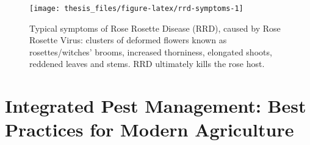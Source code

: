 \documentclass{ufdissertation}[overrideChapters] %
\begin{document}
{\begin{figure}
{\centering \texttt{[image: thesis\_files/figure-latex/rrd-symptoms-1]} 

}

\caption[Typical symptoms of Rose Rosette Disease (RRD), caused by Rose Rosette Virus]{Typical symptoms of Rose Rosette Disease (RRD), caused by Rose Rosette Virus: clusters of deformed flowers known as rosettes/witches' brooms, increased thorniness, elongated shoots, reddened leaves and stems. RRD ultimately kills the rose host.}\label{fig:rrd-symptoms}
\end{figure}
\hypertarget{integrated-pest-management-best-practices-for-modern-agriculture}{%
\section{Integrated Pest Management: Best Practices for Modern Agriculture}\label{integrated-pest-management-best-practices-for-modern-agriculture}}

}
\end{document}
